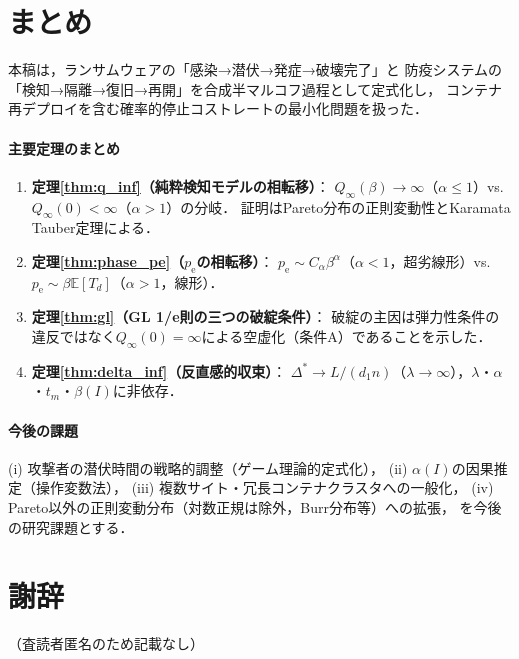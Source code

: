 \documentclass[12pt,a4paper]{article}
\theoremstyle{plain}
\theoremstyle{definition}
\theoremstyle{remark}
\newcommand{\E}{\mathbb{E}}
\newcommand{\pe}{p_{\mathrm{e}}}
\newcommand{\Qinf}{Q_{\infty}}
\newcommand{\betaI}{\beta(I)}
\newcommand{\Dopt}{\Delta^{*}}
\begin{document}
\section{まとめ}
\label{sec:conclusion}

本稿は，ランサムウェアの「感染→潜伏→発症→破壊完了」と
防疫システムの「検知→隔離→復旧→再開」を合成半マルコフ過程として定式化し，
コンテナ再デプロイを含む確率的停止コストレートの最小化問題を扱った．

\paragraph{主要定理のまとめ}
\begin{enumerate}
\item \textbf{定理\ref{thm:q_inf}（純粋検知モデルの相転移）}：
  $\Qinf(\beta)\to\infty$（$\alpha\le1$）vs.~$\Qinf(0)<\infty$（$\alpha>1$）の分岐．
  証明はPareto分布の正則変動性とKaramata Tauber定理による．

\item \textbf{定理\ref{thm:phase_pe}（$\pe$の相転移）}：
  $\pe\sim C_\alpha\beta^\alpha$（$\alpha<1$，超劣線形）vs.~$\pe\sim\beta\E[T_d]$（$\alpha>1$，線形）．

\item \textbf{定理\ref{thm:gl}（GL 1/e則の三つの破綻条件）}：
  破綻の主因は弾力性条件の違反ではなく$\Qinf(0)=\infty$による空虚化（条件A）であることを示した．

\item \textbf{定理\ref{thm:delta_inf}（反直感的収束）}：
  $\Dopt\to L/(d_1 n)$（$\lambda\to\infty$），$\lambda$・$\alpha$・$t_m$・$\betaI$に非依存．
\end{enumerate}

\paragraph{今後の課題}
(i) 攻撃者の潜伏時間の戦略的調整（ゲーム理論的定式化），
(ii) $\alpha(I)$の因果推定（操作変数法），
(iii) 複数サイト・冗長コンテナクラスタへの一般化，
(iv) Pareto以外の正則変動分布（対数正規は除外，Burr分布等）への拡張，
を今後の研究課題とする．

\section*{謝辞}
（査読者匿名のため記載なし）
\end{document}
